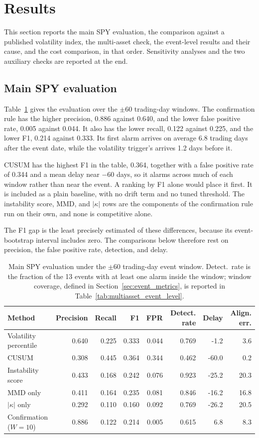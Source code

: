 \documentclass[pdflatex,sn-mathphys-num,iicol]{sn-jnl}
\begin{document}
\section{Results}
\label{sec:results}
This section reports the main SPY evaluation, the comparison against a published volatility index, the multi-asset check, the event-level results and their cause, and the cost comparison, in that order. Sensitivity analyses and the two auxiliary checks are reported at the end.

\subsection{Main SPY evaluation}
Table~\ref{tab:spy} gives the evaluation over the $\pm60$ trading-day windows. The confirmation rule has the higher precision, 0.886 against 0.640, and the lower false positive rate, 0.005 against 0.044. It also has the lower recall, 0.122 against 0.225, and the lower F1, 0.214 against 0.333. Its first alarm arrives on average 6.8 trading days after the event date, while the volatility trigger's arrives 1.2 days before it.

CUSUM has the highest F1 in the table, 0.364, together with a false positive rate of 0.344 and a mean delay near $-60$ days, so it alarms across much of each window rather than near the event. A ranking by F1 alone would place it first. It is included as a plain baseline, with no drift term and no tuned threshold. The instability score, MMD, and $|\kappa|$ rows are the components of the confirmation rule run on their own, and none is competitive alone.

The F1 gap is the least precisely estimated of these differences, because its event-bootstrap interval includes zero. The comparisons below therefore rest on precision, the false positive rate, detection, and delay.

\begin{table}[t]
\centering
\caption{Main SPY evaluation under the $\pm60$ trading-day event window. Detect.\ rate is the fraction of the 13 events with at least one alarm inside the window; window coverage, defined in Section~\ref{sec:event_metrics}, is reported in Table~\ref{tab:multiasset_event_level}.}
\label{tab:spy}
\begin{tabular}{lrrrrrrr}
\toprule
Method & Precision & Recall & F1 & FPR & Detect. rate & Delay & Align. err.\\
\midrule
Volatility percentile & 0.640 & 0.225 & 0.333 & 0.044 & 0.769 & -1.2 & 3.6\\
CUSUM & 0.308 & 0.445 & 0.364 & 0.344 & 0.462 & -60.0 & 0.2\\
Instability score & 0.433 & 0.168 & 0.242 & 0.076 & 0.923 & -25.2 & 20.3\\
MMD only & 0.411 & 0.164 & 0.235 & 0.081 & 0.846 & -16.2 & 16.8\\
$|\kappa|$ only & 0.292 & 0.110 & 0.160 & 0.092 & 0.769 & -26.2 & 20.5\\
Confirmation ($W=10$) & 0.886 & 0.122 & 0.214 & 0.005 & 0.615 & 6.8 & 8.3\\
\bottomrule
\end{tabular}
\end{table}
\end{document}
